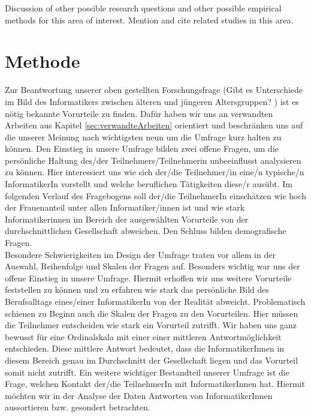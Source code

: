 \documentclass[de]{agse-empir-report}\usepackage[]{graphicx}\usepackage[]{color}
\begin{document}
Discussion of other possible research questions and other possible
empirical methods for this area of interest.
Mention and cite related studies in this area.

\lipsum[3]


\section[jk]{Methode} \label{sec:methoden}

Zur Beantwortung unserer oben gestellten Forschungsfrage (\glqq Gibt es Unterschiede im Bild des Informatikers zwischen älteren und jüngeren Altersgruppen? \grqq) ist es nötig bekannte Vorurteile zu finden. Dafür haben wir uns an verwandten Arbeiten aus Kapitel \ref{sec:verwandteArbeiten} orientiert und beschränken uns auf die unserer Meinung nach wichtigsten neun um die Umfrage kurz halten zu können. Den Einstieg in unsere Umfrage bilden zwei offene Fragen, um die persönliche Haltung des/der Teilnehmers/Teilnehmerin unbeeinflusst analysieren zu können. Hier interessiert uns wie sich der/die Teilnehmer/in eine/n typische/n InformatikerIn vorstellt und welche beruflichen Tätigkeiten diese/r ausübt. Im folgenden Verlauf des Fragebogens soll der/die TeilnehmerIn einschätzen wie hoch der Frauenanteil unter allen Informatiker/innen ist und wie stark Informatikerinnen im Bereich der ausgewählten Vorurteile von der durchschnittlichen Gesellschaft abweichen. Den Schluss bilden demografische Fragen. \\
Besondere Schwierigkeiten im Design der Umfrage traten vor allem in der Auswahl, Reihenfolge und Skalen der Fragen auf. Besonders wichtig war uns der offene Einstieg in unsere Umfrage. Hiermit erhoffen wir uns weitere Vorurteile feststellen zu können und zu erfahren wie stark das persönliche Bild des Berufsalltags eines/einer InformatikerIn von der Realität abweicht. Problematisch schienen zu Beginn auch die Skalen der Fragen zu den Vorurteilen. Hier müssen die Teilnehmer entscheiden wie stark ein Vorurteil zutrifft. Wir haben uns ganz bewusst für eine Ordinalskala mit einer einer mittleren Antwortmöglichkeit entschieden. Diese mittlere Antwort bedeutet, dass die InformatikerInnen in diesem Bereich genau im Durchschnitt der Gesellschaft liegen und das Vorurteil somit nicht zutrifft. Ein weitere wichtiger Bestandteil unserer Umfrage ist die Frage, welchen Kontakt der/die TeilnehmerIn mit InformatikerInnen hat. Hiermit möchten wir in der Analyse der Daten Antworten von InformatikerInnen aussortieren bzw. gesondert betrachten. \\
\end{document}
